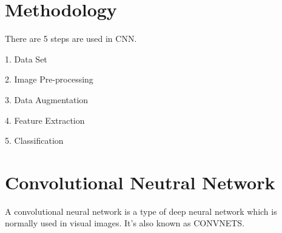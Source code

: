 \documentclass[conference]{IEEEtran}
\begin{document}
\section{Methodology}
There are 5 steps are used in CNN.

 1. Data Set 
\vspace{3mm}
 
2. Image Pre-processing
\vspace{3mm}

3. Data Augmentation
\vspace{3mm}

4. Feature Extraction
\vspace{3mm}

5. Classification



\section*{Convolutional Neutral Network}
A convolutional neural network is a type of deep neural network which is normally used in visual images. It's also known as CONVNETS.\cite{b1}
  
\end{document}
